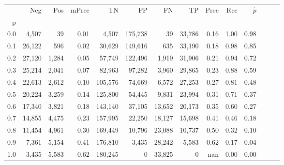 \begin{tabular}{rrrrrrrrrrrrrr}
\toprule
{} &     Neg &    Pos & mPrec &       TN &       FP &      FN &      TP &  Prec &   Rec & $\hat{p}$ \\
p   &         &        &       &          &          &         &         &       &       &           \\
\midrule
0.0 &   4,507 &     39 &  0.01 &    4,507 &  175,738 &      39 &  33,786 &  0.16 &  1.00 &      0.98 \\
0.1 &  26,122 &    596 &  0.02 &   30,629 &  149,616 &     635 &  33,190 &  0.18 &  0.98 &      0.85 \\
0.2 &  27,120 &  1,284 &  0.05 &   57,749 &  122,496 &   1,919 &  31,906 &  0.21 &  0.94 &      0.72 \\
0.3 &  25,214 &  2,041 &  0.07 &   82,963 &   97,282 &   3,960 &  29,865 &  0.23 &  0.88 &      0.59 \\
0.4 &  22,613 &  2,612 &  0.10 &  105,576 &   74,669 &   6,572 &  27,253 &  0.27 &  0.81 &      0.48 \\
0.5 &  20,224 &  3,259 &  0.14 &  125,800 &   54,445 &   9,831 &  23,994 &  0.31 &  0.71 &      0.37 \\
0.6 &  17,340 &  3,821 &  0.18 &  143,140 &   37,105 &  13,652 &  20,173 &  0.35 &  0.60 &      0.27 \\
0.7 &  14,855 &  4,475 &  0.23 &  157,995 &   22,250 &  18,127 &  15,698 &  0.41 &  0.46 &      0.18 \\
0.8 &  11,454 &  4,961 &  0.30 &  169,449 &   10,796 &  23,088 &  10,737 &  0.50 &  0.32 &      0.10 \\
0.9 &   7,361 &  5,154 &  0.41 &  176,810 &    3,435 &  28,242 &   5,583 &  0.62 &  0.17 &      0.04 \\
1.0 &   3,435 &  5,583 &  0.62 &  180,245 &        0 &  33,825 &       0 &   nan &  0.00 &      0.00 \\
\bottomrule
\end{tabular}
